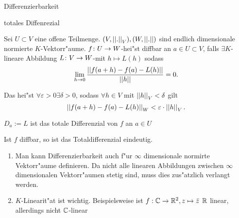 \documentclass[class=article, crop=false]{standalone}
\begin{document}
\begin{zettel}{Differenzierbarkeit}
\begin{flashcard}
\begin{question}
totales Diffenrezial
\end{question}
\begin{definition}[differenzierbar]
        Sei $U \subset  V$ eine offene Teilmenge. $(V,\left|\left|.\right|\right|_V), (W,\left|\left|.\right|\right|)$ sind endlich dimensionale normierte $K$-Vektorr"aume. $f \colon U\to W$-hei"st diffbar an $a \in  U \subset  V$, falls $\exists  K$-lineare Abbildung $L \colon V\to W$-mit $h \mapsto L (h)$ sodass
\[
    \lim_{h \to 0} \frac{ \left|\left|f (a+h)- f (a)- L (h)\right|\right|}{ \left|\left|h\right|\right|} =0
.\]

Das hei"st $\forall\varepsilon>0 \exists\delta>0$, sodass $\forall h \in V$ mit $\left|\left|h\right|\right|_V < \delta$ gilt
\[
 \left|\left| f (a +h) - f (a)- L (h)\right|\right|_W < \varepsilon \cdot  \left|\left|h\right|\right|_V
.\]

$D_a := L $ ist das totale Differenzial von $f$  an $a \in  U$ 
\end{definition}
\end{flashcard}

\begin{remark}
Ist $f$ diffbar, so ist das Totaldifferenzial eindeutig.
\end{remark}

\begin{remark}
\begin{enumerate}
    \item Man kann Differenzierbarkeit auch f"ur $\infty$ dimensionale normirte Vektorr"aume definieren. Da nicht alle linearen Abbildungen zwischen $\infty$ dimensionalen Vektorr"aumen stetig sind, muss dies zus"atzlich verlangt werden.
    \item $K$-Linearit"at ist wichtig. Beispielsweise ist $f: \mathbb{C} \to \mathbb{R}^2, z \mapsto \bar{z}$ $\mathbb{R} $ linear, allerdings nicht $\mathbb{C} $-linear
\end{enumerate}
\end{remark}

\end{zettel}
\end{document}

